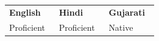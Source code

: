 \begin{tabular}{@{} p{0.3\linewidth} p{0.3\linewidth} p{0.3\linewidth} @{}}
    \textbf{English} & \textbf{Hindi} & \textbf{Gujarati} \\
    Proficient       & Proficient     & Native
\end{tabular}
